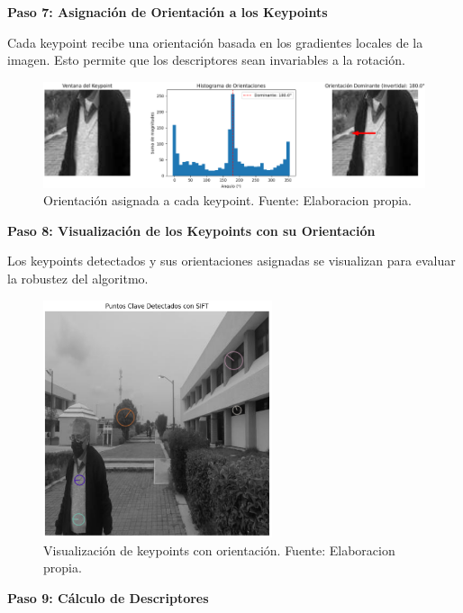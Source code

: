 \documentclass[a4paper]{article}
\begin{document}
\textbf{Paso 7: Asignación de Orientación a los Keypoints}
\par\vspace{0.5cm}

Cada keypoint recibe una orientación basada en los gradientes locales de la imagen. Esto permite que los descriptores sean invariables a la rotación.

\begin{figure}[H]
    \centering
    \includegraphics[width=1.1\textwidth]{images/sift_paso_6.1.png}
    \caption{Orientación asignada a cada keypoint. Fuente: Elaboracion propia.}
\end{figure}

\textbf{Paso 8: Visualización de los Keypoints con su Orientación}
\par\vspace{0.5cm}

Los keypoints detectados y sus orientaciones asignadas se visualizan para evaluar la robustez del algoritmo.

\begin{figure}[H]
    \centering
    \includegraphics[width=0.6\textwidth]{images/sift_paso_7.1.png}
    \caption{Visualización de keypoints con orientación. Fuente: Elaboracion propia.}
\end{figure}

\textbf{Paso 9: Cálculo de Descriptores}
\par\vspace{0.5cm}
\end{document}
